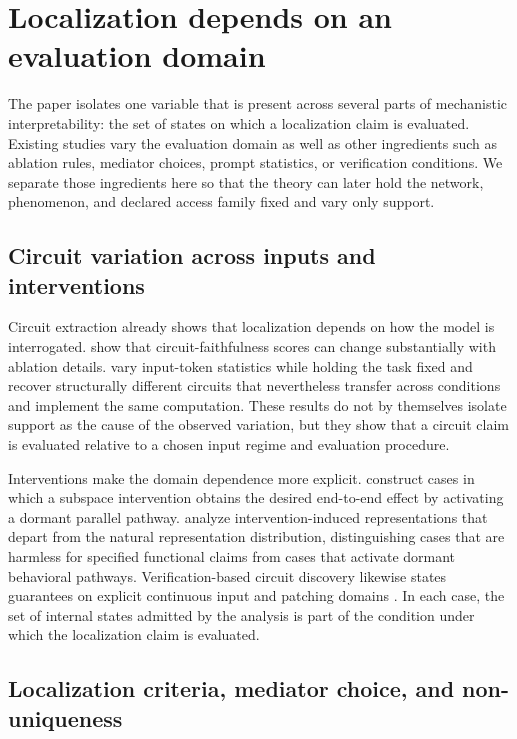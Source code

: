 \section{Localization depends on an evaluation domain}
\label{sec:related-work}

The paper isolates one variable that is present across several parts of mechanistic interpretability: the set of states on which a localization claim is evaluated. Existing studies vary the evaluation domain as well as other ingredients such as ablation rules, mediator choices, prompt statistics, or verification conditions. We separate those ingredients here so that the theory can later hold the network, phenomenon, and declared access family fixed and vary only support.

\subsection{Circuit variation across inputs and interventions}

Circuit extraction already shows that localization depends on how the model is interrogated. \citet{miller2024faithfulness} show that circuit-faithfulness scores can change substantially with ablation details. \citet{bayat2026many} vary input-token statistics while holding the task fixed and recover structurally different circuits that nevertheless transfer across conditions and implement the same computation. These results do not by themselves isolate support as the cause of the observed variation, but they show that a circuit claim is evaluated relative to a chosen input regime and evaluation procedure.

Interventions make the domain dependence more explicit. \citet{makelov2024subspace} construct cases in which a subspace intervention obtains the desired end-to-end effect by activating a dormant parallel pathway. \citet{grant2026divergent} analyze intervention-induced representations that depart from the natural representation distribution, distinguishing cases that are harmless for specified functional claims from cases that activate dormant behavioral pathways. Verification-based circuit discovery likewise states guarantees on explicit continuous input and patching domains \citep{hadad2026formal}. In each case, the set of internal states admitted by the analysis is part of the condition under which the localization claim is evaluated.

\subsection{Localization criteria, mediator choice, and non-uniqueness}

